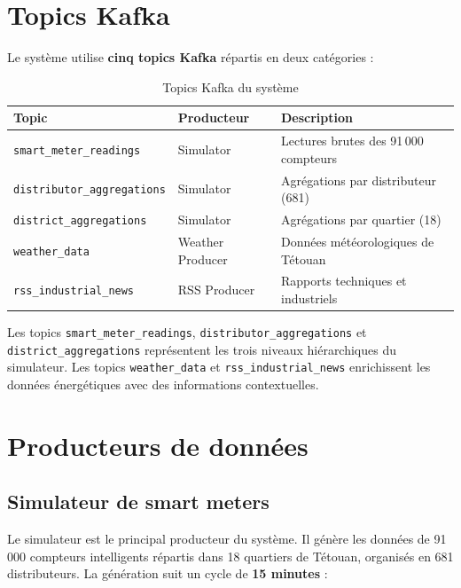 \documentclass[1pt,a4paper]{report}
\begin{document}
\section{Topics Kafka}

Le système utilise \textbf{cinq topics Kafka} répartis en deux catégories :

\begin{table}[H]
\centering
\renewcommand{\arraystretch}{1.4}
\begin{tabular}{|l|l|l|}
\hline
\textbf{Topic} & \textbf{Producteur} & \textbf{Description} \\
\hline
\texttt{smart\_meter\_readings} & Simulator & Lectures brutes des 91\,000 compteurs \\
\hline
\texttt{distributor\_aggregations} & Simulator & Agrégations par distributeur (681) \\
\hline
\texttt{district\_aggregations} & Simulator & Agrégations par quartier (18) \\
\hline
\texttt{weather\_data} & Weather Producer & Données météorologiques de Tétouan \\
\hline
\texttt{rss\_industrial\_news} & RSS Producer & Rapports techniques et industriels \\
\hline
\end{tabular}
\caption{Topics Kafka du système}
\label{tab:kafka_topics}
\end{table}

Les topics \texttt{smart\_meter\_readings}, \texttt{distributor\_aggregations} et
\texttt{district\_aggregations} représentent les trois niveaux hiérarchiques du simulateur.
Les topics \texttt{weather\_data} et \texttt{rss\_industrial\_news} enrichissent les
données énergétiques avec des informations contextuelles.

\section{Producteurs de données}

\subsection{Simulateur de smart meters}

Le simulateur est le principal producteur du système. Il génère les données
de 91\,000 compteurs intelligents répartis dans 18 quartiers de Tétouan,
organisés en 681 distributeurs. La génération suit un cycle de \textbf{15 minutes} :
\end{document}
